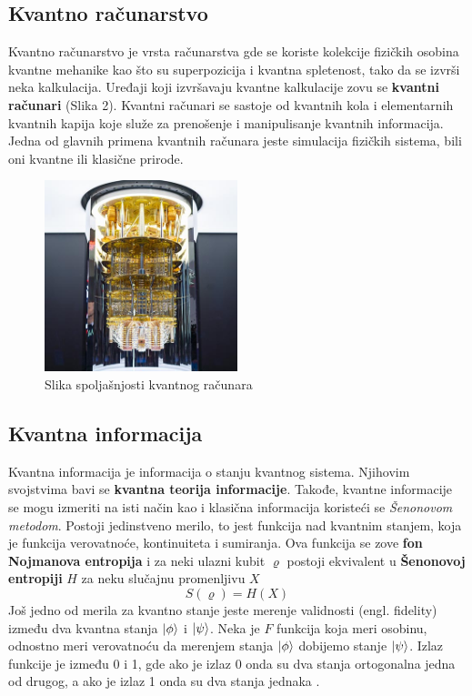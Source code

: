 \documentclass[12pt, letterpaper, oneside]{article}
\begin{document}
\subsection{Kvantno računarstvo}
Kvantno računarstvo je vrsta računarstva gde se koriste kolekcije fizičkih osobina kvantne mehanike kao što su superpozicija i kvantna spletenost,
tako da se izvrši neka kalkulacija. Uređaji koji izvršavaju kvantne kalkulacije zovu se \textbf{kvantni računari} (Slika 2).
Kvantni računari se sastoje od kvantnih kola i elementarnih kvantnih kapija koje služe za prenošenje i manipulisanje kvantnih informacija.
\cite{nielsen_chuang_10th} \\
Jedna od glavnih primena kvantnih računara jeste simulacija fizičkih sistema, bili oni kvantne ili klasične prirode.
\begin{figure}[ht]
    \centering
    \includegraphics[width=0.5\textwidth]{files/media_sizes_full_QC-stack-fig-2.jpg}
    \caption{Slika spoljašnjosti kvantnog računara \cite{QuantumComputerImage}}
\end{figure}

\subsection{Kvantna informacija}
Kvantna informacija je informacija o stanju kvantnog sistema. Njihovim svojstvima bavi se \textbf{kvantna teorija informacije}.
Takođe, kvantne informacije se mogu izmeriti na isti način kao i klasična informacija koristeći se \textit{Šenonovom metodom}. 
Postoji jedinstveno merilo, to jest funkcija nad kvantnim stanjem, koja je funkcija verovatnoće, kontinuiteta i sumiranja.\cite{vlatko_v}
Ova funkcija se zove \textbf{fon Nojmanova entropija} i za neki ulazni kubit $\varrho$ postoji ekvivalent u \textbf{Šenonovoj entropiji} $H$
za neku slučajnu promenljivu $X$
\[
    S(\varrho) = H(X)
\]
Još jedno od merila za kvantno stanje jeste merenje validnosti (engl. fidelity) između dva kvantna stanja $\ket{\phi}$ i $\ket{\psi}$.
Neka je $F$ funkcija koja meri osobinu, odnostno meri verovatnoću da merenjem stanja $\ket{\phi}$ dobijemo stanje $\ket{\psi}$.
Izlaz funkcije je između 0 i 1, gde ako je izlaz 0 onda su dva stanja ortogonalna jedna od drugog, a ako je izlaz 1 onda su dva stanja jednaka \cite{vlatko_v}.
\end{document}

